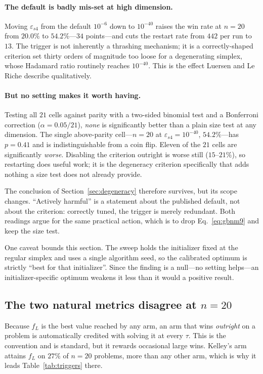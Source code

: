 \documentclass[11pt,a4paper]{article}
\begin{document}
\paragraph{The default is badly mis-set at high dimension.} Moving
$\varepsilon_{s4}$ from the default $10^{-6}$ down to $10^{-40}$ raises the win
rate at $n=20$ from $20.0\%$ to $54.2\%$---$34$ points---and cuts the restart
rate from $442$ per run to $13$. The trigger is not inherently a thrashing
mechanism; it is a correctly-shaped criterion set thirty orders of magnitude too
loose for a degenerating simplex, whose Hadamard ratio routinely reaches
$10^{-40}$. This is the effect Luersen and Le Riche describe qualitatively.

\paragraph{But no setting makes it worth having.} Testing all $21$ cells against
parity with a two-sided binomial test and a Bonferroni correction
($\alpha=0.05/21$), \emph{none} is significantly better than a plain size test at
any dimension. The single above-parity cell---$n=20$ at $\varepsilon_{s4}=10^{-40}$,
$54.2\%$---has $p=0.41$ and is indistinguishable from a coin flip. Eleven of the
$21$ cells are significantly \emph{worse}. Disabling the criterion outright is
worse still ($15$--$21\%$), so restarting does useful work; it is the degeneracy
criterion specifically that adds nothing a size test does not already provide.

The conclusion of Section~\ref{sec:degeneracy} therefore survives, but its scope
changes. ``Actively harmful'' is a statement about the published default, not
about the criterion: correctly tuned, the trigger is merely redundant. Both
readings argue for the same practical action, which is to drop
Eq.~\eqref{eq:gbnm9} and keep the size test.

One caveat bounds this section. The sweep holds the initializer fixed at the
regular simplex and uses a single algorithm seed, so the calibrated optimum is
strictly ``best for that initializer''. Since the finding is a null---no setting
helps---an initializer-specific optimum weakens it less than it would a positive
result.

\subsection{The two natural metrics disagree at $n=20$}
\label{sec:metrics}

Because $f_L$ is the best value reached by any arm, an arm that wins
\emph{outright} on a problem is automatically credited with solving it at every
$\tau$. This is the \citet{more2009} convention and is standard, but it rewards
occasional large wins. Kelley's arm attains $f_L$ on $27\%$ of $n=20$ problems,
more than any other arm, which is why it leads Table~\ref{tab:triggers} there.
\end{document}
